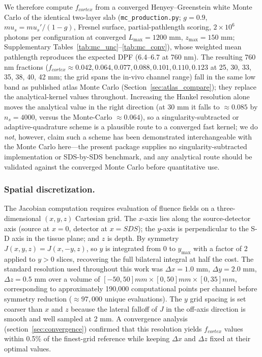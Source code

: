 \documentclass[11pt]{article}
\def\mu{mu}%
\def\mathrm#1{#1}%
\def\,{ }%
\begin{document}
We therefore compute $f_{\mathrm{cortex}}$ from a converged Henyey--Greenstein white Monte Carlo of the identical two-layer slab (\texttt{mc\_production.py}; $g=0.9$, $\mu_s=\mu_s'/(1-g)$, Fresnel surface, partial-pathlength scoring, $2\times10^{6}$ photons per configuration at converged $L_{\max}=1200$\,mm, $z_{\max}=150$\,mm; Supplementary Tables~\ref{tab:mc_unc}--\ref{tab:mc_conv}), whose weighted mean pathlength reproduces the expected DPF (6.4--6.7 at 760\,nm). The resulting 760\,nm fractions ($f_{\mathrm{cortex}} \approx 0.042, 0.064, 0.077, 0.088, 0.101, 0.110, 0.123$ at 25, 30, 33, 35, 38, 40, 42\,mm; the grid spans the in-vivo channel range) fall in the same low band as published atlas Monte Carlo (Section~\ref{sec:atlas_compare}); they replace the analytical-kernel values throughout. Increasing the Hankel resolution alone moves the analytical value in the right direction (at 30\,mm it falls to $\approx0.085$ by $n_s=4000$, versus the Monte-Carlo $\approx0.064$), so a singularity-subtracted or adaptive-quadrature scheme is a plausible route to a converged fast kernel; we do \emph{not}, however, claim such a scheme has been demonstrated interchangeable with the Monte Carlo here---the present package supplies no singularity-subtracted implementation or SDS-by-SDS benchmark, and any analytical route should be validated against the converged Monte Carlo before quantitative use.

\subsubsection{Spatial discretization.}
The Jacobian computation requires evaluation of fluence fields on a three-dimensional $(x, y, z)$ Cartesian grid. The $x$-axis lies along the source-detector axis (source at $x = 0$, detector at $x = \mathrm{SDS}$); the $y$-axis is perpendicular to the S-D axis in the tissue plane; and $z$ is depth. By symmetry $J(x, y, z) = J(x, -y, z)$, so $y$ is integrated from 0 to $y_{\max}$ with a factor of 2 applied to $y > 0$ slices, recovering the full bilateral integral at half the cost. The standard resolution used throughout this work was $\Delta x = 1.0$\,mm, $\Delta y = 2.0$\,mm, $\Delta z = 0.5$\,mm over a volume of $[-50, 50]\,\mathrm{mm} \times [0, 50]\,\mathrm{mm} \times [0, 35]\,\mathrm{mm}$, corresponding to approximately 190{,}000 computational points per channel before symmetry reduction ($\approx 97{,}000$ unique evaluations). The $y$ grid spacing is set coarser than $x$ and $z$ because the lateral falloff of $J$ in the off-axis direction is smooth and well sampled at 2\,mm. A convergence analysis (section~\ref{sec:convergence}) confirmed that this resolution yields $f_{\mathrm{cortex}}$ values within 0.5\% of the finest-grid reference while keeping $\Delta x$ and $\Delta z$ fixed at their optimal values.
\end{document}
